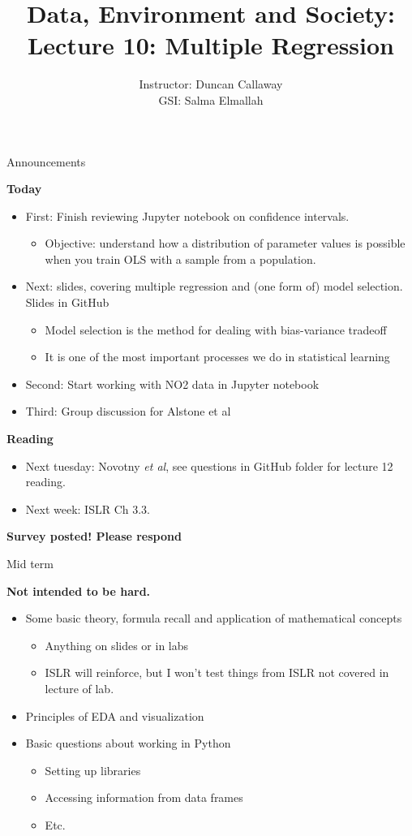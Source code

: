 \documentclass[aspectratio=169]{beamer}
\title[Lecture 10: Multiple Regression] %
{Data, Environment and Society: \\{Lecture 10: Multiple Regression}}
\author[ER131: Data, Environment and Society] 
{Instructor: Duncan Callaway\\
GSI: Salma Elmallah}
\institute[UC Berkeley] %
 {\small{ \bf October 1, 2019}}
\date[October 1, 2019]
\begin{document}
\begin{frame}
  \titlepage
\end{frame}

\begin{frame}{Announcements}

\textbf{Today}
\begin{itemize}
\item First: Finish reviewing Jupyter notebook on confidence intervals.
\begin{itemize}
  \item Objective: understand how a distribution of parameter values is possible when you train OLS with a sample from a population.  
\end{itemize}
\item Next: slides, covering multiple regression and (one form of) model selection.  Slides in GitHub
\begin{itemize}
  \item Model selection is the method for dealing with bias-variance tradeoff
  \item It is one of the most important processes we do in statistical learning  
\end{itemize}
\item Second: Start working with NO2 data in Jupyter notebook
\item Third: Group discussion for Alstone et al
\end{itemize}

\textbf{Reading}
\begin{itemize}
\item Next tuesday: Novotny \textit{et al}, see questions in GitHub folder for lecture 12 reading.
\item Next week: ISLR Ch 3.3.
\end{itemize}

\textbf{Survey posted!  Please respond}
\end{frame}


\begin{frame}{Mid term}

\textbf{Not intended to be hard.  }
\begin{itemize}
\item Some basic theory, formula recall and application of mathematical concepts
\begin{itemize}
\item Anything on slides or in labs
\item ISLR will reinforce, but I won't test things from ISLR not covered in lecture of lab.
\end{itemize}
\item Principles of EDA and visualization
\item Basic questions about working in Python
\begin{itemize}
\item Setting up libraries
\item Accessing information from data frames
\item Etc.  
\end{itemize}
\end{itemize}

\end{frame}
\end{document}
